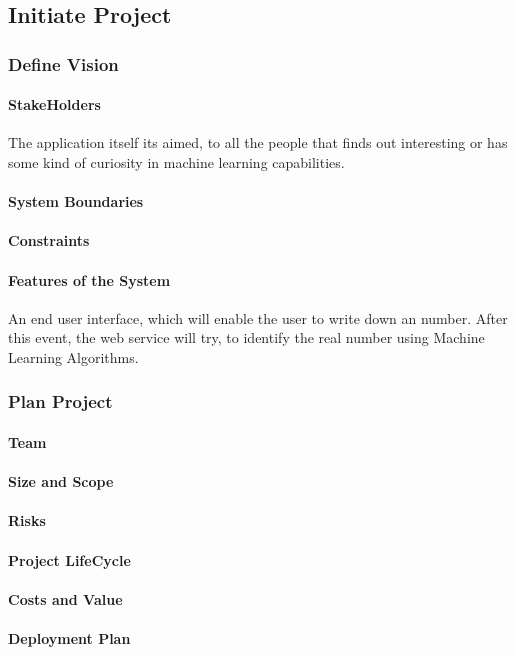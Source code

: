 \subsection{Initiate Project}

\subsubsection{Define Vision}
 
\paragraph{StakeHolders}
 The application itself its aimed, to all the people that finds out interesting or has some kind of curiosity in machine learning capabilities.
 
\paragraph{System Boundaries}

\paragraph{Constraints}

\paragraph{Features of the System}
 An end user interface, which will enable the user to write down an number. After this event, the web service will try, to identify the real number using Machine Learning Algorithms.

\subsubsection{Plan Project}

\paragraph{Team}

\paragraph{Size and Scope}

\paragraph{Risks}

\paragraph{Project LifeCycle}

\paragraph{Costs and Value}

\paragraph{Deployment Plan}
